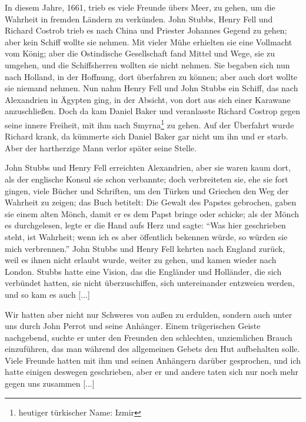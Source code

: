 In diesem Jahre, 1661, trieb es viele Freunde übers Meer,
zu gehen, um die Wahrheit in fremden Ländern zu verkünden.
John Stubbs, Henry Fell 
und Richard Costrob trieb es nach
China und Priester Johannes Gegend zu gehen; aber kein Schiff
wollte sie nehmen. Mit vieler Mühe erhielten sie eine Vollmacht
vom König; aber die Ostindische Gesellschaft fand Mittel und
Wege, sie zu umgehen, und die Schiffsherren wollten sie nicht
nehmen. Sie begaben sich nun nach Holland, in der Hoffnung,
dort überfahren zu können; aber auch dort wollte sie niemand
nehmen. Nun nahm Henry Fell und John Stubbs ein Schiff,
das nach Alexandrien in Ägypten ging, in der Absicht, von dort
aus sich einer Karawane anzuschließen. Doch da kam Daniel
Baker und veranlasste Richard 
Costrop gegen seine innere 
Freiheit, mit ihm nach Smyrna\footnote{heutiger türkischer Name: 
Izmir} zu gehen. Auf der Überfahrt wurde
Richard krank, da kümmerte sich Daniel Baker gar nicht um ihn
und er starb. Aber der hartherzige Mann verlor später seine Stelle.

John Stubbs und Henry Fell erreichten Alexandrien, aber
sie waren kaum dort, als der englische Konsul sie schon verbannte;
doch verbreiteten sie, ehe sie fort gingen, viele Bücher und Schriften,
um den Türken und Griechen den Weg der Wahrheit zu zeigen;
das Buch betitelt: \glqq{}Die Gewalt des Papstes gebrochen\grqq{}, gaben
sie einem alten Mönch, damit er es dem Papst bringe oder
schicke; als der Mönch es durchgelesen, legte er die Hand aufs
Herz und sagte: "`Was hier geschrieben steht, ist Wahrheit; wenn
ich es aber öffentlich bekennen würde, so würden sie mich verbrennen."'
John Stubbs und Henry Fell kehrten nach England zurück, weil es 
ihnen nicht erlaubt wurde, weiter zu gehen,
und kamen wieder nach London. Stubbs hatte eine Vision, das
die Engländer und Holländer, die sich verbündet hatten, sie nicht
überzuschiffen, sich untereinander entzweien werden, und so kam
es auch [...]

Wir hatten aber nicht nur Schweres von außen zu erdulden,
sondern auch unter uns durch John Perrot 
und seine Anhänger. Einem trügerischen Geiste nachgebend, 
suchte er unter den Freunden den schlechten, unziemlichen 
Brauch einzuführen, das man während
des allgemeinen Gebets den Hut aufbehalten solle. Viele Freunde
hatten mit ihm und seinen Anhängern darüber gesprochen, und
ich hatte einigen deswegen geschrieben, aber er und andere taten
sich nur noch mehr gegen uns zusammen [...]

